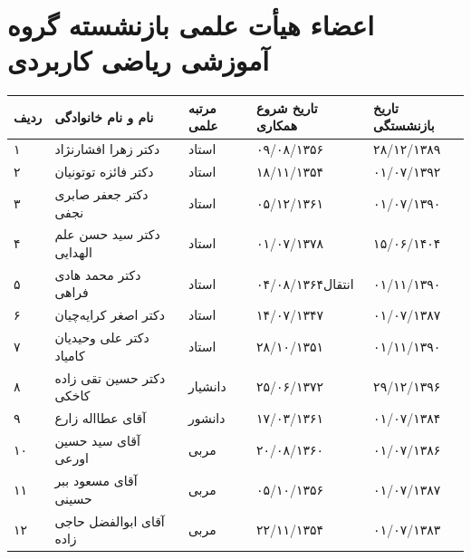 \documentclass[
  letterpaper,
  DIV=11,
  numbers=noendperiod]{scrreprt}
\newcounter{none} %
\begin{document}
\section{اعضاء هیأت علمی بازنشسته گروه آموزشی ریاضی
کاربردی}\label{ux627ux639ux636ux627ux621-ux647ux6ccux623ux62a-ux639ux644ux645ux6cc-ux628ux627ux632ux646ux634ux633ux62aux647-ux6afux631ux648ux647-ux622ux645ux648ux632ux634ux6cc-ux631ux6ccux627ux636ux6cc-ux6a9ux627ux631ux628ux631ux62fux6cc}

{\def\LTcaptype{none} %
\begin{longtable}[]{@{}
  >{\raggedright\arraybackslash}p{}
  >{\raggedright\arraybackslash}p{}
  >{\raggedright\arraybackslash}p{}
  >{\raggedright\arraybackslash}p{}
  >{\raggedright\arraybackslash}p{}@{}}
\toprule\noalign{}
\begin{minipage}[b]{\linewidth}\raggedright
ردیف
\end{minipage} & \begin{minipage}[b]{\linewidth}\raggedright
نام و نام خانوادگی
\end{minipage} & \begin{minipage}[b]{\linewidth}\raggedright
مرتبه علمی
\end{minipage} & \begin{minipage}[b]{\linewidth}\raggedright
تاریخ شروع همکاری
\end{minipage} & \begin{minipage}[b]{\linewidth}\raggedright
تاریخ بازنشستگی
\end{minipage} \\
\midrule\noalign{}
\endhead
\bottomrule\noalign{}
\endlastfoot
۱ & دکتر زهرا افشارنژاد & استاد & ۰۹/۰۸/۱۳۵۶ & ۲۸/۱۲/۱۳۸۹ \\
۲ & دکتر فائزه توتونیان & استاد & ۱۸/۱۱/۱۳۵۴ & ۰۱/۰۷/۱۳۹۲ \\
۳ & دکتر جعفر صابری نجفی & استاد & ۰۵/۱۲/۱۳۶۱ & ۰۱/۰۷/۱۳۹۰ \\
۴ & دکتر سید حسن علم الهدایی & استاد & ۰۱/۰۷/۱۳۷۸ & ۱۵/۰۶/۱۴۰۴ \\
۵ & دکتر محمد هادی فراهی & استاد & انتقال۰۴/۰۸/۱۳۶۴ & ۰۱/۱۱/۱۳۹۰ \\
۶ & دکتر اصغر کرایه‌چیان & استاد & ۱۴/۰۷/۱۳۴۷ & ۰۱/۰۷/۱۳۸۷ \\
۷ & دکتر علی وحیدیان کامیاد & استاد & ۲۸/۱۰/۱۳۵۱ & ۰۱/۱۱/۱۳۹۰ \\
۸ & دکتر حسین تقی زاده کاخکی & دانشیار & ۲۵/۰۶/۱۳۷۲ & ۲۹/۱۲/۱۳۹۶ \\
۹ & آقای عطااله زارع & دانشور & ۱۷/۰۳/۱۳۶۱ & ۰۱/۰۷/۱۳۸۴ \\
۱۰ & آقای سید حسین اورعی & مربی & ۲۰/۰۸/۱۳۶۰ & ۰۱/۰۷/۱۳۸۶ \\
۱۱ & آقای مسعود ببر حسینی & مربی & ۰۵/۱۰/۱۳۵۶ & ۰۱/۰۷/۱۳۸۷ \\
۱۲ & آقای ابوالفضل حاجی زاده & مربی & ۲۲/۱۱/۱۳۵۴ & ۰۱/۰۷/۱۳۸۳ \\
\end{longtable}
}
\end{document}
